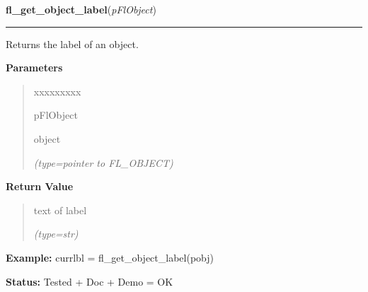 \hspace{.8\funcindent}\begin{boxedminipage}{\funcwidth}

    \raggedright \textbf{fl\_get\_object\_label}(\textit{pFlObject})

    \vspace{-1.5ex}

    \rule{\textwidth}{0.5\fboxrule}
\setlength{\parskip}{2ex}
    Returns the label of an object.

\setlength{\parskip}{1ex}
      \textbf{Parameters}
      \vspace{-1ex}

      \begin{quote}
        \begin{Ventry}{xxxxxxxxx}

          \item[pFlObject]

          object

            {\it (type=pointer to FL\_OBJECT)}

        \end{Ventry}

      \end{quote}

      \textbf{Return Value}
    \vspace{-1ex}

      \begin{quote}
      text of label

      {\it (type=str)}

      \end{quote}

\textbf{Example:} currlbl = fl\_get\_object\_label(pobj)



\textbf{Status:} Tested + Doc + Demo = OK



    \end{boxedminipage}

    \label{xformslib:flbasic:fl_set_object_helper}

    \vspace{0.5ex}

